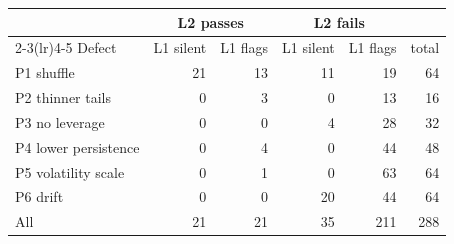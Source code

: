 \begin{tabular}{lrrrrr}
\toprule
& \multicolumn{2}{c}{L2 passes} & \multicolumn{2}{c}{L2 fails} & \\
\cmidrule(lr){2-3}\cmidrule(lr){4-5}
Defect & L1 silent & L1 flags & L1 silent & L1 flags & total \\
\midrule
P1 shuffle & 21 & 13 & 11 & 19 & 64 \\
P2 thinner tails & 0 & 3 & 0 & 13 & 16 \\
P3 no leverage & 0 & 0 & 4 & 28 & 32 \\
P4 lower persistence & 0 & 4 & 0 & 44 & 48 \\
P5 volatility scale & 0 & 1 & 0 & 63 & 64 \\
P6 drift & 0 & 0 & 20 & 44 & 64 \\
\midrule
All & 21 & 21 & 35 & 211 & 288 \\
\bottomrule
\end{tabular}
